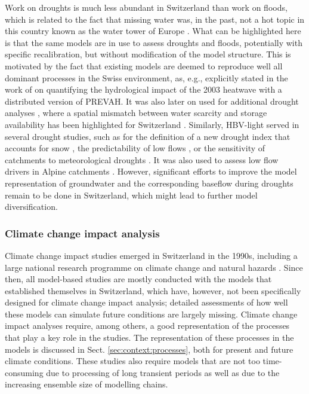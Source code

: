 \documentclass[10pt,a4paper]{article}
\begin{document}
Work on droughts is much less abundant in Switzerland than work on floods, which is related to the fact that missing water was, in the past, not a hot topic in this country known as the water tower of Europe \citep{Milano2015}. What can be highlighted here is that the same models are in use to assess droughts and floods, potentially with specific recalibration, but without modification of the model structure. This is motivated by the fact that existing models are deemed to reproduce well all dominant processes in the Swiss environment, as, e.g., explicitly stated in the work of \citet{Zappa2007a} on quantifying the hydrological impact of the 2003 heatwave with a distributed version of PREVAH. It was also later on used for additional drought analyses \citep{Brunner2019e, Zappa2019}, where a spatial mismatch between water scarcity and storage availability has been highlighted for Switzerland \citep{Brunner2019e}. Similarly, HBV-light served in several drought studies, such as for the definition of a new drought index that accounts for snow \citep{Staudinger2014}, the predictability of low flows \citep{Staudinger2014a}, or the sensitivity of catchments to meteorological droughts \citep{Staudinger2015}. It was also used to assess low flow drivers in Alpine catchments \citep{Arnoux2020}. However, significant efforts to improve the model representation of groundwater and the corresponding baseflow during droughts remain to be done in Switzerland, which might lead to further model diversification.


\subsubsection{Climate change impact analysis}
\label{sec:context:climatechange}

Climate change impact studies emerged in Switzerland in the 1990s, including a large national research programme on climate change and natural hazards \citep{SNFS2021}. Since then, all model-based studies are mostly conducted with the models that established themselves in Switzerland, which have, however, not been specifically designed for climate change impact analysis; detailed assessments of how well these models can simulate future conditions are largely missing. Climate change impact analyses require, among others, a good representation of the processes that play a key role in the studies. The representation of these processes in the models is discussed in Sect. \ref{sec:context:processes}, both for present and future climate conditions. These studies also require models that are not too time-consuming due to processing of long transient periods as well as due to the increasing ensemble size of modelling chains.
\end{document}
